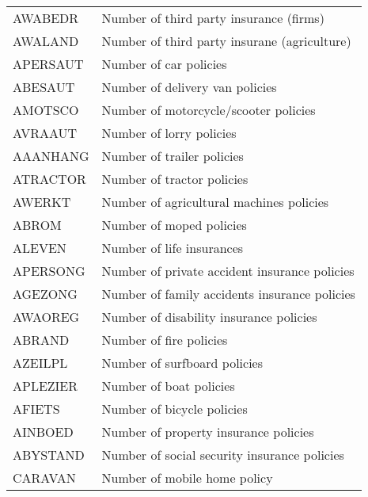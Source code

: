 \documentclass[man]{apa6}
\begin{document}
\begin{center}
\begin{ThreePartTable}
\begin{longtable}{ll}
AWABEDR & Number of third party insurance (firms)\\
AWALAND & Number of third party insurane (agriculture)\\
APERSAUT & Number of car policies\\
ABESAUT & Number of delivery van policies\\
AMOTSCO & Number of motorcycle/scooter policies\\
AVRAAUT & Number of lorry policies\\
AAANHANG & Number of trailer policies\\
ATRACTOR & Number of tractor policies\\
AWERKT & Number of agricultural machines policies\\
ABROM & Number of moped policies\\
ALEVEN & Number of life insurances\\
APERSONG & Number of private accident insurance policies\\
AGEZONG & Number of family accidents insurance policies\\
AWAOREG & Number of disability insurance policies\\
ABRAND & Number of fire policies\\
AZEILPL & Number of surfboard policies\\
APLEZIER & Number of boat policies\\
AFIETS & Number of bicycle policies\\
AINBOED & Number of property insurance policies\\
ABYSTAND & Number of social security insurance policies\\
CARAVAN & Number of mobile home policy\\
\bottomrule
\end{longtable}
\end{ThreePartTable}
\end{center}
\end{document}
